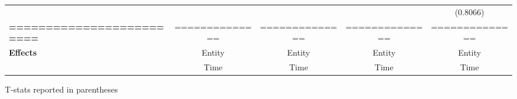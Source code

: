 \begin{center}
\begin{tabular}{lcccc}
\textbf{ }                         &                &                  &                  &     (0.8066)      \\
\textbf{=========================} & ============== &  ==============  &  ==============  &  ==============   \\
\textbf{Effects}                   &     Entity     &      Entity      &      Entity      &      Entity       \\
\textbf{}                          &      Time      &       Time       &       Time       &       Time        \\
\bottomrule
\end{tabular}
\end{center}

T-stats reported in parentheses
